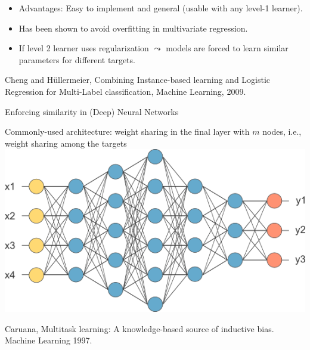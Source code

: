 \begin{frame}
\begin{columns}
\begin{column}{5cm}
		\end{column}
	\end{columns}
%
	\begin{itemize}
		\item Advantages: Easy to implement and general (usable with any level-1 learner). 
		\item Has been shown to avoid overfitting in multivariate regression.
		\item If level 2 learner uses regularization $\leadsto$ models are forced to learn similar parameters for different targets.  
	\end{itemize}
	{\tiny Cheng and H\"ullermeier, Combining Instance-based learning and Logistic Regression for Multi-Label classification, Machine Learning, 2009.}
	
\end{frame}

\begin{frame}{Enforcing similarity in (Deep) Neural Networks}
	\small
	\begin{center}
		Commonly-used architecture: weight sharing in the final layer with $m$ nodes, i.e., weight sharing among the targets \\
		\vspace{0.2cm}
		\includegraphics[scale=0.4]{figure/weightsharing}
	\end{center}

{\tiny Caruana, Multitask learning: A knowledge-based source of inductive bias. Machine	Learning 1997.}
\end{frame}


